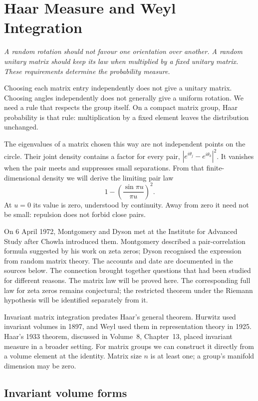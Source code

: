 \chapter{Haar Measure and Weyl Integration}

\begin{center}\itshape
A random rotation should not favour one orientation over another.
A random unitary matrix should keep its law when multiplied by a fixed
unitary matrix. These requirements determine the probability measure.
\end{center}

Choosing each matrix entry independently does not give a unitary matrix.
Choosing angles independently does not generally give a uniform rotation.
We need a rule that respects the group itself. On a compact matrix group,
Haar probability is that rule: multiplication by a fixed element leaves
the distribution unchanged.

The eigenvalues of a matrix chosen this way are not independent points
on the circle. Their joint density contains a factor for every pair,
$|e^{i\theta_j}-e^{i\theta_k}|^2$. It vanishes when the pair meets and
suppresses small separations. From that finite-dimensional density we
will derive the limiting pair law
\[
 1-\left(\frac{\sin\pi u}{\pi u}\right)^2.
\]
At $u=0$ its value is zero, understood by continuity. Away from zero it
need not be small: repulsion does not forbid close pairs.

On 6 April 1972, Montgomery and Dyson met at the Institute for Advanced
Study after Chowla introduced them. Montgomery described a pair-correlation
formula suggested by his work on zeta zeros; Dyson recognised the expression
from random matrix theory. The accounts and date are documented in the
sources below. The connection brought together questions that had been
studied for different reasons. The matrix law will be proved here.
The corresponding full law for zeta zeros remains conjectural; the
restricted theorem under the Riemann hypothesis will be identified
separately from it.

Invariant matrix integration predates Haar's general theorem. Hurwitz
used invariant volumes in 1897, and Weyl used them in representation
theory in 1925. Haar's 1933 theorem, discussed in Volume~8, Chapter~13,
placed invariant measure in a broader setting. For matrix groups we
can construct it directly from a volume element at the identity.
Matrix size $n$ is at least one; a group's manifold dimension may be zero.

\section{Invariant volume forms}

